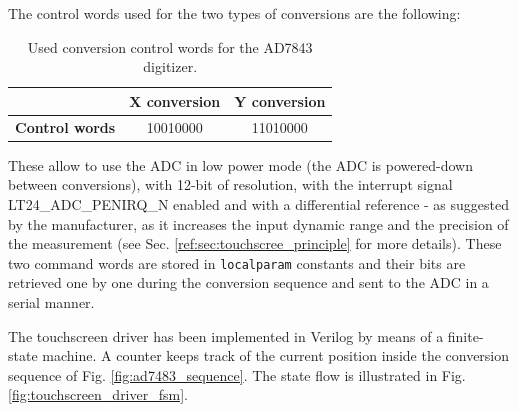 \documentclass[11pt]{report}
\begin{document}
\medskip
The control words used for the two types of conversions are the following:

\begin{table}[!h]
\renewcommand{\arraystretch}{1.5}
\centering
\begin{tabular}{c|c|c|}
\cline{2-3}
                                             & \textbf{X conversion} & \textbf{Y conversion} \\ \hline
\multicolumn{1}{|c|}{\textbf{Control words}} & 10010000              & 11010000              \\ \hline
\end{tabular}
\label{tab:conversion_control_words}
\caption{Used conversion control words for the AD7843 digitizer.}
\end{table}

These allow to use the ADC in low power mode (the ADC is powered-down between conversions), with 12-bit of resolution, with the interrupt signal LT24\_ADC\_PENIRQ\_N enabled and with a differential reference - as suggested by the manufacturer, as it increases the input dynamic range and the precision of the measurement (see Sec. \ref{ref:sec:touchscree_principle} for more details).
These two command words are stored in \texttt{localparam} constants and their bits are retrieved one by one during the conversion sequence and sent to the ADC in a serial manner.

\bigskip

The touchscreen driver has been implemented in Verilog by means of a finite-state machine. A counter keeps track of the current position inside the conversion sequence of Fig. \ref{fig:ad7483_sequence}. The state flow is illustrated in Fig. \ref{fig:touchscreen_driver_fsm}.
\end{document}
